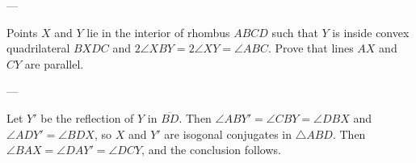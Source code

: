 
---

Points $X$ and $Y$ lie in the interior of rhombus $ABCD$ such that $Y$ is inside convex quadrilateral $BXDC$ and $2\angle XBY=2\angle XY=\angle ABC$. Prove that lines $AX$ and $CY$ are parallel.

---

Let $Y'$ be the reflection of $Y$ in $\overline{BD}$. Then $\angle ABY'=\angle CBY=\angle DBX$ and $\angle ADY'=\angle BDX$, so $X$ and $Y'$ are isogonal conjugates in $\triangle ABD$. Then $\angle BAX=\angle DAY'=\angle DCY$, and the conclusion follows. 
